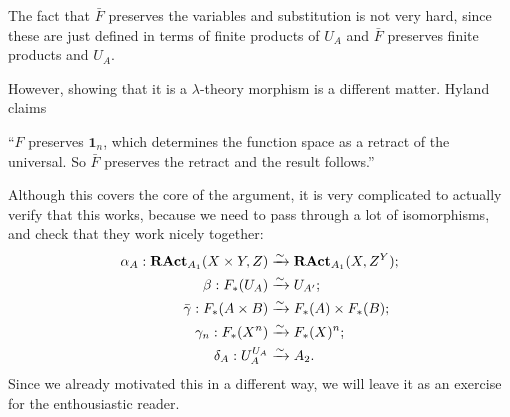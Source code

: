 \begin{remark}
  The fact that $ \bar F $ preserves the variables and substitution is not very hard, since these are just defined in terms of finite products of $ U_A $ and $ \bar F $ preserves finite products and $ U_A $.

  However, showing that it is a $ \lambda $-theory morphism is a different matter. Hyland claims

  \enquote{$ F $ preserves $ \mathbf 1_n $, which determines the function space as a retract of the universal. So $ \bar F $ preserves the retract and the result follows.}

  Although this covers the core of the argument, it is very complicated to actually verify that this works, because we need to pass through a lot of isomorphisms, and check that they work nicely together:
  \begin{align*}
    \alpha_A: \mathbf{RAct}_{A_1}(X \times Y, Z) &\xrightarrow{\sim} \mathbf{RAct}_{A_1}(X, Z^Y);\\
    \beta: F_*(U_A) &\xrightarrow{\sim} U_{A^\prime};\\
    \bar \gamma: F_*(A \times B) &\xrightarrow{\sim} F_*(A) \times F_*(B);\\
    \gamma_n: F_*(X^n) &\xrightarrow{\sim} F_*(X)^n;\\
    \delta_A: U_A^{U_A} &\xrightarrow{\sim} A_2.
  \end{align*}
  Since we already motivated this in a different way, we will leave it as an exercise for the enthousiastic reader.

\end{remark}
